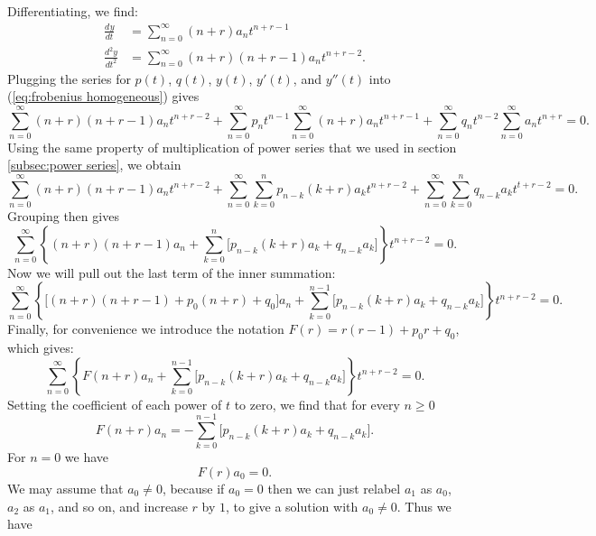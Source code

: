 \documentclass{myart}
\newcommand{\eq}[1]{(\ref{eq:#1})}
\newcommand{\deriv}[3][]{\frac{d^{#1}#2}{d#3^{#1}}}
\begin{document}
Differentiating, we find:
\begin{align*}
\deriv{y}{t} &= \sum_{n=0}^\infty (n+r) a_n t^{n+r-1} \\
\deriv[2]{y}{t} &= \sum_{n=0}^\infty (n+r)(n+r-1) a_n t^{n+r-2}.
\end{align*}
Plugging the series for $p(t)$, $q(t)$, $y(t)$, $y'(t)$, and $y''(t)$ into \eq{frobenius homogeneous} gives
\begin{equation*}
\sum_{n=0}^\infty (n+r)(n+r-1) a_n t^{n+r-2} + \sum_{n=0}^\infty p_n t^{n-1} \sum_{n=0}^\infty (n+r) a_n t^{n+r-1} + \sum_{n=0}^\infty q_n t^{n-2} \sum_{n=0}^\infty a_n t^{n+r} = 0.
\end{equation*}
Using the same property of multiplication of power series that we used in section \ref{subsec:power series}, we obtain
\begin{equation*}
\sum_{n=0}^\infty (n+r)(n+r-1) a_n t^{n+r-2} + \sum_{n=0}^\infty \sum_{k=0}^n p_{n-k} (k+r) a_k t^{n+r-2} + \sum_{n=0}^\infty \sum_{k=0}^n q_{n-k} a_k t^{t+r-2} = 0.
\end{equation*}
Grouping then gives
\begin{equation*}
\sum_{n=0}^\infty \left\{(n+r)(n+r-1) a_n + \sum_{k=0}^n \Big[p_{n-k} (k+r) a_k + q_{n-k} a_k\Big]\right\} t^{n+r-2} = 0.
\end{equation*}
Now we will pull out the last term of the inner summation:
\begin{equation*}
\sum_{n=0}^\infty \left\{\Big[(n+r)(n+r-1) + p_0 (n+r) + q_0\Big] a_n + \sum_{k=0}^{n-1} \Big[p_{n-k} (k+r) a_k + q_{n-k} a_k\Big]\right\} t^{n+r-2} = 0.
\end{equation*}
Finally, for convenience we introduce the notation $F(r) = r(r-1) + p_0r + q_0$, which gives:
\begin{equation} \label{eq:frobenius lhs}
\sum_{n=0}^\infty \left\{F(n + r) a_n + \sum_{k=0}^{n-1} \Big[p_{n-k} (k+r) a_k + q_{n-k} a_k\Big]\right\} t^{n+r-2} = 0.
\end{equation}
Setting the coefficient of each power of $t$ to zero, we find that for every $n \geq 0$
\begin{equation} \label{eq:frobenius coefficients unsolved}
F(n+r) a_n = -\sum_{k=0}^{n-1} \Big[p_{n-k} (k+r) a_k + q_{n-k} a_k\Big].
\end{equation}
For $n = 0$ we have
\begin{equation*}
F(r) a_0 = 0.
\end{equation*}
We may assume that $a_0 \neq 0$, because if $a_0 = 0$ then we can just relabel $a_1$ as $a_0$, $a_2$ as $a_1$, and so on, and increase $r$ by $1$, to give a solution with $a_0 \neq 0$. Thus we have
\end{document}
